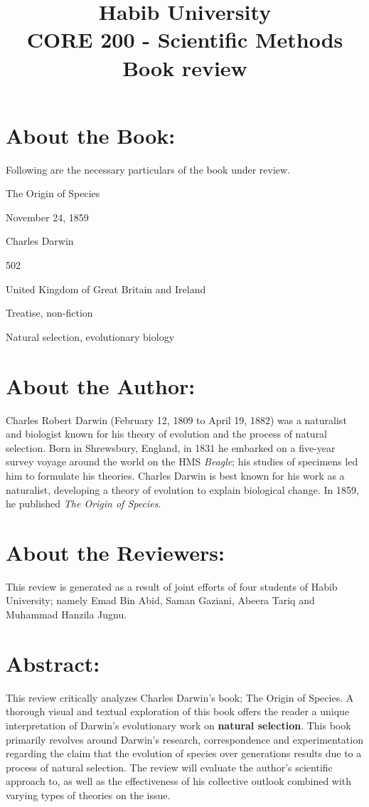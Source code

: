 \documentclass{article}
\title{\textbf{Habib University}\\ \textbf{CORE 200 - Scientific Methods}\\ \textbf{Book review}}
\begin{document}
\maketitle

%

\section*{About the Book:}
	Following are the necessary particulars of the book under review. \\
	\begin{description}[font=$\bullet$~\normalfont\scshape\color{red!50!black}]
		\item [Book] The Origin of Species
		\item [Originally published] November 24, 1859
		\item [Author] Charles Darwin
		\item [Page count] 502
		\item [Country] United Kingdom of Great Britain and Ireland
		\item [Genres] Treatise, non-fiction
		\item [Subjects] Natural selection, evolutionary biology
	\end{description}
 

\section*{About the Author:}
	Charles Robert Darwin (February 12, 1809 to April 19, 1882) was a naturalist and biologist known for his theory of evolution and the process of natural selection. Born in Shrewsbury, England, in 1831 he embarked on a five-year survey voyage around the world on the HMS \textit{Beagle}; his studies of specimens led him to formulate his theories. Charles Darwin is best known for his work as a naturalist, developing a theory of evolution to explain biological change. In 1859, he published \textit{The Origin of Species}. 
	
\section*{About the Reviewers:}
	This review is generated as a result of joint efforts of four students of Habib University; namely Emad Bin Abid, Saman Gaziani, Abeera Tariq and Muhammad Hanzila Jugnu.

\section*{Abstract:}
	This review critically analyzes Charles Darwin's book; The Origin of Species. A thorough visual and textual exploration of this book offers the reader a unique interpretation of Darwin's evolutionary work on \textbf{natural selection}. This book primarily revolves around Darwin's research, correspondence and experimentation regarding the claim that the evolution of species over generations results due to a process of natural selection. The review will evaluate the author's scientific approach to, as well as the effectiveness of his collective outlook combined with varying types of theories on the issue.
\end{document}
